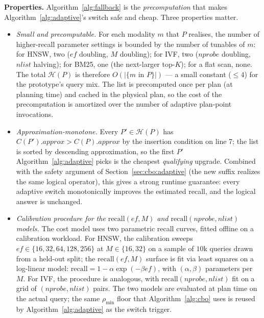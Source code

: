 \documentclass[sigconf,nonacm,review]{acmart}
\theoremstyle{plain}
\theoremstyle{definition}
\theoremstyle{remark}
\begin{document}
\noindent\textbf{Properties.}
Algorithm~\ref{alg:fallback} is the
\emph{precomputation} that makes Algorithm~\ref{alg:adaptive}'s
switch safe and cheap. Three properties matter.

\begin{itemize}[leftmargin=*]
  \item \emph{Small and precomputable.}
  For each modality $m$ that $P$ realises, the number of
  higher-recall parameter settings is bounded by the
  number of tunables of $m$: for HNSW, two
  ($\mathit{ef}$ doubling, $M$ doubling); for IVF, two
  ($\mathit{nprobe}$ doubling, $\mathit{nlist}$ halving);
  for BM25, one (the next-larger top-$K$); for a flat
  scan, none. The total $\mathcal{H}(P)$ is therefore
  $O(|\{m \text{ in } P\}|)$ --- a small constant
  ($\le 4$) for the prototype's query mix. The list is
  precomputed once per plan (at planning time) and
  cached in the physical plan, so the cost of the
  precomputation is amortized over the number of adaptive
  plan-point invocations.
  \item \emph{Approximation-monotone.}
  Every $P' \in \mathcal{H}(P)$ has
  $C(P').\mathit{approx} > C(P).\mathit{approx}$ by the
  insertion condition on line 7; the list is sorted by
  descending approximation, so the first $P'$ Algorithm~\ref{alg:adaptive}
  picks is the cheapest \emph{qualifying} upgrade.
  Combined with the safety argument of
  Section~\ref{sec:cbo:adaptive} (the new suffix
  realizes the same logical operator), this gives a
  strong runtime guarantee: every adaptive switch
  monotonically improves the estimated recall, and the
  logical answer is unchanged.
  \item \emph{Calibration procedure for the
  $\mathrm{recall}(\mathit{ef}, M)$ and
  $\mathrm{recall}(\mathit{nprobe}, \mathit{nlist})$
  models.} The cost model uses two parametric
  recall curves, fitted offline on a calibration
  workload. For HNSW, the calibration sweeps
  $\mathit{ef} \in \{16, 32, 64, 128, 256\}$ at
  $M \in \{16, 32\}$ on a sample of $10$k queries
  drawn from a held-out split; the
  $\mathrm{recall}(\mathit{ef}, M)$ surface is fit
  via least squares on a log-linear model:
  $\mathrm{recall} = 1 - \alpha \exp(-\beta \mathit{ef})$,
  with $(\alpha, \beta)$ parameters per $M$. For IVF,
  the procedure is analogous, with
  $\mathrm{recall}(\mathit{nprobe}, \mathit{nlist})$
  fit on a grid of $(\mathit{nprobe}, \mathit{nlist})$
  pairs. The two models are evaluated at plan time on
  the actual query; the same $\rho_{\min}$ floor that
  Algorithm~\ref{alg:cbo} uses is reused by
  Algorithm~\ref{alg:adaptive} as the switch
  trigger.
\end{itemize}
\end{document}
